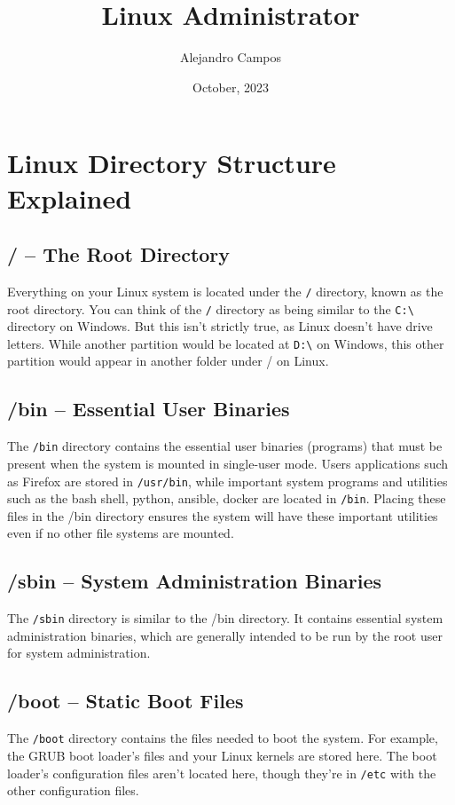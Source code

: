 \documentclass{article}
\title{\textbf{Linux Administrator}}
\author{Alejandro Campos}
\date{October, 2023}
\begin{document}
\maketitle
\newpage
\tableofcontents

\newpage
\section{Linux Directory Structure Explained}

\subsection{/ -- The Root Directory}
Everything on your Linux system is located under the \verb|/| directory, known as the root directory. You can think of the \verb|/| directory as being similar to the \verb|C:\| directory on Windows. But this isn't strictly true, as Linux doesn't have drive letters. While another partition would be located at \verb|D:\| on Windows, this other partition would appear in another folder under / on Linux.

\subsection{/bin -- Essential User Binaries}
The \verb|/bin| directory contains the essential user binaries (programs) that must be present when the system is mounted in single-user mode. Users applications such as Firefox are stored in \verb|/usr/bin|, while important system programs and utilities such as the bash shell, python, ansible, docker are located in \verb|/bin|. Placing these files in the /bin directory ensures the system will have these important utilities even if no other file systems are mounted.

\subsection{/sbin -- System Administration Binaries}
The \verb|/sbin| directory is similar to the /bin directory. It contains essential system administration binaries, which are generally intended to be run by the root user for system administration.

\subsection{/boot -- Static Boot Files}
The \verb|/boot| directory contains the files needed to boot the system. For example, the GRUB boot loader's files and your Linux kernels are stored here. The boot loader's configuration files aren't located here, though they're in \verb|/etc| with the other configuration files.
\end{document}
